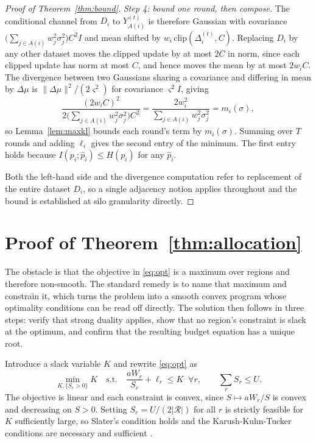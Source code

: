 \documentclass[acmsmall,screen,review,anonymous]{acmart}
\theoremstyle{acmdefinition}%
\newcommand{\Reg}{\mathcal{R}}
\begin{document}
\begin{proof}[Proof of Theorem~\ref{thm:bound}]
\emph{Step 4: bound one round, then compose.}
The conditional channel from $D_i$ to $Y_{A(i)}^{(t)}$ is therefore Gaussian with
covariance $\big(\sum_{j \in A(i)} w_j^2 \sigma_j^2\big) C^2 I$ and mean shifted by
$w_i \,\mathrm{clip}(\Delta_i^{(t)}, C)$. Replacing $D_i$ by any other dataset
moves the clipped update by at most $2C$ in norm, since each clipped update has
norm at most $C$, and hence moves the mean by at most $2 w_i C$. The divergence
between two Gaussians sharing a covariance and differing in mean by $\Delta\mu$ is
$\|\Delta\mu\|^2 / (2\varsigma^2)$ for covariance $\varsigma^2 I$, giving
\begin{equation}
\frac{(2 w_i C)^2}{2 \big(\sum_{j \in A(i)} w_j^2 \sigma_j^2\big) C^2}
= \frac{2 w_i^2}{\sum_{j \in A(i)} w_j^2 \sigma_j^2} = m_i(\sigma),
\end{equation}
so Lemma~\ref{lem:maxkl} bounds each round's term by $m_i(\sigma)$. Summing over
$T$ rounds and adding $\ell_i$ gives the second entry of the minimum. The first
entry holds because $I(p_i ; \hat{p}_i) \le H(p_i)$ for any $\hat{p}_i$.

Both the left-hand side and the divergence computation refer to replacement of the
entire dataset $D_i$, so a single adjacency notion applies throughout and the
bound is established at silo granularity directly.
\end{proof}

\section{Proof of Theorem~\ref{thm:allocation}}
\label{app:alloc}

The obstacle is that the objective in \eqref{eq:opt} is a maximum over regions and
therefore non-smooth. The standard remedy is to name that maximum and constrain it,
which turns the problem into a smooth convex program whose optimality conditions can
be read off directly. The solution then follows in three steps: verify that strong
duality applies, show that no region's constraint is slack at the optimum, and
confirm that the resulting budget equation has a unique root.

Introduce a slack variable $K$ and rewrite \eqref{eq:opt} as
\begin{equation}
\min_{K, \{S_r > 0\}} K
\quad \text{s.t.} \quad
\frac{a W_r}{S_r} + \ell_r \le K \;\; \forall r,
\qquad \sum_r S_r \le U .
\label{eq:convex}
\end{equation}
The objective is linear and each constraint is convex, since $S \mapsto aW_r/S$ is
convex and decreasing on $S > 0$. Setting $S_r = U / (2 |\Reg|)$ for all $r$ is
strictly feasible for $K$ sufficiently large, so Slater's condition holds and the
Karush-Kuhn-Tucker conditions are necessary and sufficient
\cite{boyd2004convex}.
\end{document}

